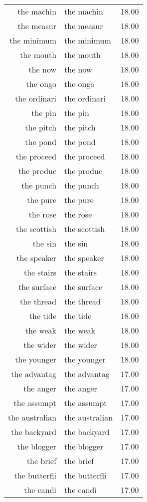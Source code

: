 \begin{table}[ht]
\begin{tabular}{rlr}
  the machin & the machin & 18.00 \\ 
  the measur & the measur & 18.00 \\ 
  the minimum & the minimum & 18.00 \\ 
  the mouth & the mouth & 18.00 \\ 
  the now & the now & 18.00 \\ 
  the ongo & the ongo & 18.00 \\ 
  the ordinari & the ordinari & 18.00 \\ 
  the pin & the pin & 18.00 \\ 
  the pitch & the pitch & 18.00 \\ 
  the pond & the pond & 18.00 \\ 
  the proceed & the proceed & 18.00 \\ 
  the produc & the produc & 18.00 \\ 
  the punch & the punch & 18.00 \\ 
  the pure & the pure & 18.00 \\ 
  the rose & the rose & 18.00 \\ 
  the scottish & the scottish & 18.00 \\ 
  the sin & the sin & 18.00 \\ 
  the speaker & the speaker & 18.00 \\ 
  the stairs & the stairs & 18.00 \\ 
  the surface & the surface & 18.00 \\ 
  the thread & the thread & 18.00 \\ 
  the tide & the tide & 18.00 \\ 
  the weak & the weak & 18.00 \\ 
  the wider & the wider & 18.00 \\ 
  the younger & the younger & 18.00 \\ 
  the advantag & the advantag & 17.00 \\ 
  the anger & the anger & 17.00 \\ 
  the assumpt & the assumpt & 17.00 \\ 
  the australian & the australian & 17.00 \\ 
  the backyard & the backyard & 17.00 \\ 
  the blogger & the blogger & 17.00 \\ 
  the brief & the brief & 17.00 \\ 
  the butterfli & the butterfli & 17.00 \\ 
  the candi & the candi & 17.00 \\ 

\end{tabular}
\end{table}
